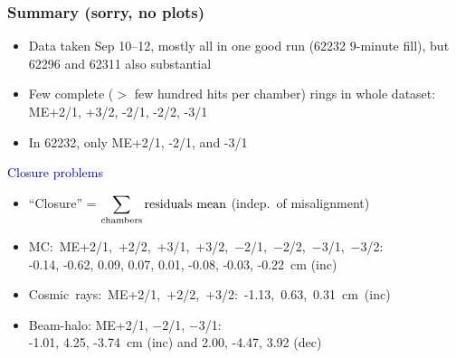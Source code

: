 \documentclass[compress]{beamer}
\begin{document}
\begin{frame}
\frametitle{Summary (sorry, no plots)}
\begin{itemize}\setlength{\itemsep}{0.25 cm}
\item Data taken Sep 10--12, mostly all in one good run (62232
  9-minute fill), but 62296 and 62311 also substantial
\item Few complete ($>$ few hundred hits per chamber) rings in whole
  dataset: ME+2/1, +3/2, -2/1, -2/2, -3/1
\item In 62232, only ME+2/1, -2/1, and -3/1
\end{itemize}

\vfill
\hspace{-0.83 cm} \textcolor{darkblue}{\Large Closure problems}
\vspace{0.2 cm}
\begin{itemize}\setlength{\itemsep}{0.25 cm}
\item ``Closure'' = $\displaystyle \sum_{\mbox{\scriptsize chambers}} \mbox{residuals mean}$ (indep.\ of misalignment)
\item \mbox{MC: ME+2/1, +2/2, +3/1, +3/2, $-$2/1, $-$2/2, $-$3/1, $-$3/2: \hspace{-1 cm}} \\
-0.14, -0.62, 0.09, 0.07, 0.01, -0.08, -0.03, -0.22~cm (inc)
\item \mbox{Cosmic rays: ME+2/1, +2/2, +3/2: -1.13, 0.63, 0.31~cm (inc) \hspace{-1 cm}}
\item Beam-halo: ME+2/1, $-$2/1, $-$3/1: \\
-1.01, 4.25, -3.74~cm (inc) and 2.00, -4.47, 3.92 (dec) \\
\end{itemize}

\end{frame}

\end{document}
